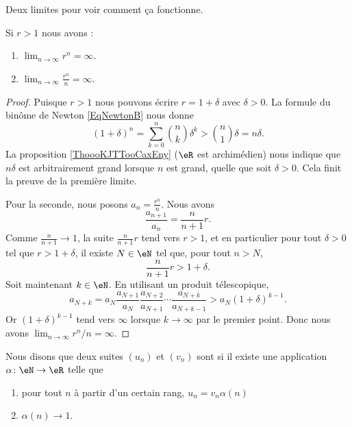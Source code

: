Deux limites pour voir comment ça fonctionne.
\begin{lemma}       \label{LEMooWCRSooWXVvcc}
	Si \( r>1\) nous avons :
	\begin{enumerate}
		\item
		      \( \lim_{n\to \infty} r^n=\infty\).
		\item
		      \( \lim_{n\to \infty} \frac{ r^n }{ n }=\infty\).
	\end{enumerate}
\end{lemma}

\begin{proof}
	Puisque \( r>1\) nous pouvons écrire \( r=1+\delta\) avec \( \delta>0\). La formule du binôme de Newton \eqref{EqNewtonB} nous donne
	\begin{equation}
		(1+\delta)^n=\sum_{k=0}^n{n\choose k}\delta^k>{n\choose 1}\delta=n\delta.
	\end{equation}
	La proposition \ref{ThoooKJTTooCaxEny} (\( \eR\) est archimédien) nous indique que \( n\delta\) est arbitrairement grand lorsque \( n\) est grand, quelle que soit \( \delta>0\). Cela finit la preuve de la première limite.

	Pour la seconde, nous posons \( a_n=\frac{ r^n }{ n }\). Nous avons
	\begin{equation}
		\frac{ a_{n+1} }{ a_n }=\frac{ n }{ n+1 }r.
	\end{equation}
	Comme \( \frac{ n }{ n+1 }\to 1\), la suite \( \frac{ n }{ n+1 }r\) tend vers \( r>1\), et en particulier pour tout \( \delta>0\) tel que \( r>1+\delta\), il existe \( N\in \eN\) tel que, pour tout \( n > N \),
	\begin{equation}
		\frac{ n }{ n+1 }r>1+\delta.
	\end{equation}
	Soit maintenant \( k\in \eN\). En utilisant un produit télescopique,
	\begin{equation}
		a_{N+k}=a_N\frac{ a_{N+1} }{ a_N }\frac{ a_{N+2} }{ a_{N+1} }\cdots\frac{ a_{N+k} }{ a_{N+k-1} }>a_N(1+\delta)^{k-1}.
	\end{equation}
	Or \( (1+\delta)^{k-1}\) tend vers \( \infty\) lorsque \( k\to \infty\) par le premier point. Donc nous avons \( \lim_{n\to \infty} r^n/n=\infty\).
\end{proof}

\begin{definition}      \label{DEFooEWRTooKgShmT}
	Nous disons que deux suites \( (u_n)\) et \( (v_n)\) sont  si il existe une application \( \alpha\colon \eN\to \eR\) telle que
	\begin{enumerate}
		\item
		      pour tout \( n\) à partir d'un certain rang, \( u_n=v_n\alpha(n)\)
		\item
		      \( \alpha(n)\to 1\).
	\end{enumerate}
\end{definition}




